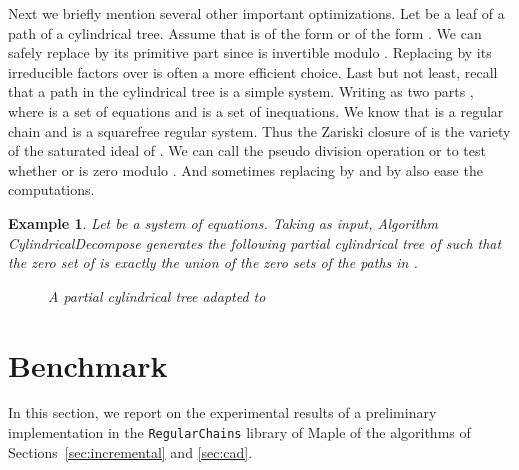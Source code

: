 \documentclass[10pt]{article}
\newtheorem{Example}{Example}
\newcommand{\Maple}{{\sc  Maple}}
\newcommand{\RegularChains}{{\tt  Regu\-lar\-Chains}}
\begin{document}
\begin{center}
Next we briefly mention several other important optimizations.
Let  be a leaf of a path  of a cylindrical tree. 
Assume that  is of the form  or of  the form  .
We can safely replace  by its primitive part since 
is invertible modulo . 
Replacing  by its irreducible factors over  is often a 
more efficient choice.
Last but not least,
recall that a path  in the cylindrical tree is a simple system.
Writing  as two parts , where  is 
a set of equations and  is a set of inequations. 
We know that  is a regular chain and  is a squarefree regular system. 
Thus the Zariski closure of  is the variety of the saturated ideal of .
We can call the pseudo division operation  or 
to test whether  or  is zero modulo . 
And sometimes replacing  by  and  by 
also ease the computations.

\begin{Example}
Let  be a system of equations. 
Taking  as input, Algorithm {\sf CylindricalDecompose} generates the 
following partial cylindrical tree  of  such that the zero set of 
is exactly the union of the zero sets of the paths in .
\begin{figure}[htbp]
\begin{center}
\caption{A partial cylindrical tree  adapted to }
\label{fig:tree-eqs}
\end{center}
\end{figure}
\end{Example}


\section{Benchmark}
\label{sec:benchmark}
In this section, we report on the experimental results 
of a preliminary implementation 
in the {\RegularChains} 
library of {\Maple} of the algorithms of Sections~\ref{sec:incremental}
and \ref{sec:cad}.


\end{center}
\end{document}
